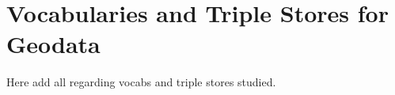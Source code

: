 
\chapter{Vocabularies and Triple Stores for Geodata }
\label{ch:ch2}

Here add all regarding vocabs and triple stores studied.
